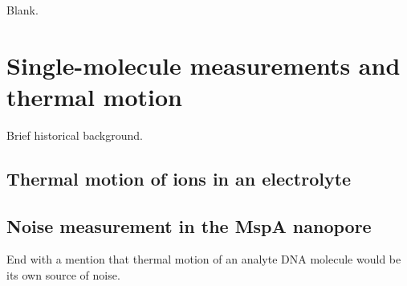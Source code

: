 \begin{savequote}[75mm]
Blank.
\end{savequote}

\chapter{Single-molecule measurements and thermal motion}
\label{thermal_motion}

Brief historical background.

\section{Thermal motion of ions in an electrolyte}

\section{Noise measurement in the MspA nanopore}

End with a mention that thermal motion of an analyte DNA molecule would be its own source of noise.